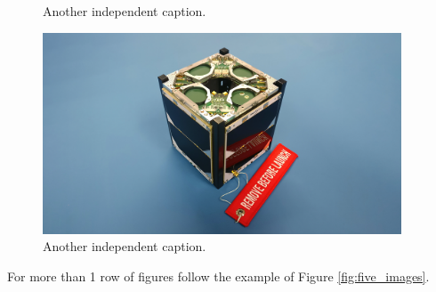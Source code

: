 \begin{figure}[!htb]
\begin{minipage}{.2\linewidth}
        \caption{Another independent caption.}
		\label{fig:four_in_row_3}
    \end{minipage}
	\begin{minipage}{.2\linewidth}
        \centering
        \includegraphics[width=0.95\textwidth]{images/istsat1.jpeg}
        \caption{Another independent caption.}
		\label{fig:four_in_row_4}
    \end{minipage}
\end{figure}

For more than 1 row of figures follow the example of Figure \ref{fig:five_images}.

